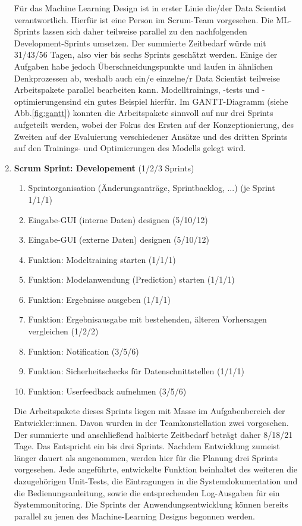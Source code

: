 \begin{enumerate}
	Für das Machine Learning Design ist in erster Linie die/der Data Scientist verantwortlich. Hierfür ist eine Person im Scrum-Team vorgesehen. Die ML-Sprints lassen sich daher teilweise parallel zu den nachfolgenden  Development-Sprints umsetzen.  Der summierte Zeitbedarf würde mit 31/43/56 Tagen, also vier bis sechs Sprints geschätzt werden. Einige der Aufgaben habe jedoch Überschneidungspunkte und laufen in ähnlichen Denkprozessen ab, weshalb auch ein/e einzelne/r Data Scientist teilweise Arbeitspakete parallel bearbeiten kann. Modelltrainings, -tests und -optimierungensind ein gutes Beispiel hierfür. Im GANTT-Diagramm (siehe Abb.\ref{fig:gantt}) konnten die Arbeitspakete sinnvoll auf nur drei Sprints aufgeteilt werden, wobei der Fokus des Ersten auf der Konzeptionierung, des Zweiten auf der Evaluierung verschiedener Ansätze und des dritten Sprints auf den Trainings- und Optimierungen des Modells gelegt wird.
	
	\item \textbf{Scrum Sprint: Developement} (1/2/3 Sprints)	
	\begin{enumerate}
		\item Sprintorganisation (Änderungsanträge, Sprintbacklog, ...) (je Sprint 1/1/1)
		\item Eingabe-GUI (interne Daten) designen (5/10/12)
		\item Eingabe-GUI (externe Daten) designen (5/10/12)
		\item Funktion: Modeltraining starten (1/1/1)
		\item Funktion: Modelanwendung (Prediction) starten (1/1/1)
		\item Funktion: Ergebnisse ausgeben (1/1/1)
		\item Funktion: Ergebnisausgabe mit bestehenden, älteren Vorhersagen vergleichen (1/2/2)
		\item Funktion: Notification (3/5/6)
		\item Funktion: Sicherheitschecks für Datenschnittstellen (1/1/1)
		\item Funktion: Userfeedback aufnehmen (3/5/6)
	\end{enumerate}
	
	Die Arbeitspakete dieses Sprints liegen mit Masse im Aufgabenbereich der Entwickler:innen. Davon wurden in der Teamkonstellation zwei vorgesehen. Der summierte und anschließend halbierte Zeitbedarf beträgt daher 8/18/21 Tage. Das Entspricht ein bis drei Sprints. Nachdem Entwicklung zumeist länger dauert als angenommen, werden hier für die Planung drei Sprints vorgesehen. Jede angeführte, entwickelte Funktion beinhaltet des weiteren die dazugehörigen Unit-Tests, die Eintragungen in die Systemdokumentation und die Bedienungsanleitung, sowie die entsprechenden Log-Ausgaben für ein Systemmonitoring. Die Sprints der Anwendungsentwicklung können bereits parallel zu jenen des Machine-Learning Designs begonnen werden.


\end{enumerate}
